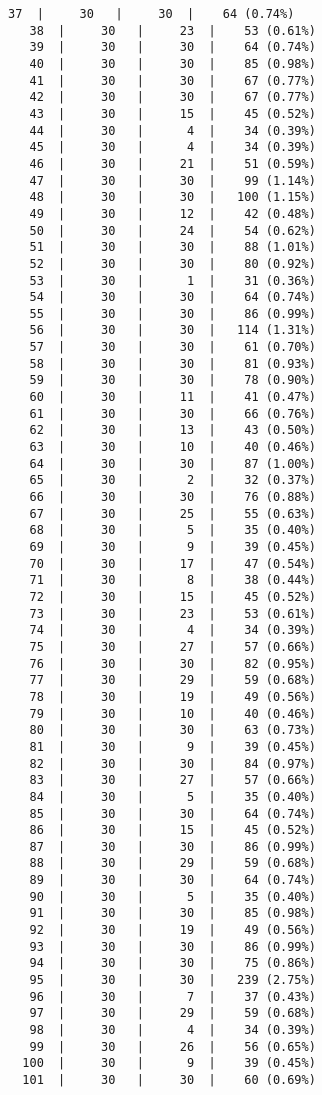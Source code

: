 \documentclass[10pt]{article}
\begin{document}
\begin{Verbatim}[fontsize=\small, commandchars=\\\{\}]
   37  |     30   |     30  |    64 (0.74%)
   38  |     30   |     23  |    53 (0.61%)
   39  |     30   |     30  |    64 (0.74%)
   40  |     30   |     30  |    85 (0.98%)
   41  |     30   |     30  |    67 (0.77%)
   42  |     30   |     30  |    67 (0.77%)
   43  |     30   |     15  |    45 (0.52%)
   44  |     30   |      4  |    34 (0.39%)
   45  |     30   |      4  |    34 (0.39%)
   46  |     30   |     21  |    51 (0.59%)
   47  |     30   |     30  |    99 (1.14%)
   48  |     30   |     30  |   100 (1.15%)
   49  |     30   |     12  |    42 (0.48%)
   50  |     30   |     24  |    54 (0.62%)
   51  |     30   |     30  |    88 (1.01%)
   52  |     30   |     30  |    80 (0.92%)
   53  |     30   |      1  |    31 (0.36%)
   54  |     30   |     30  |    64 (0.74%)
   55  |     30   |     30  |    86 (0.99%)
   56  |     30   |     30  |   114 (1.31%)
   57  |     30   |     30  |    61 (0.70%)
   58  |     30   |     30  |    81 (0.93%)
   59  |     30   |     30  |    78 (0.90%)
   60  |     30   |     11  |    41 (0.47%)
   61  |     30   |     30  |    66 (0.76%)
   62  |     30   |     13  |    43 (0.50%)
   63  |     30   |     10  |    40 (0.46%)
   64  |     30   |     30  |    87 (1.00%)
   65  |     30   |      2  |    32 (0.37%)
   66  |     30   |     30  |    76 (0.88%)
   67  |     30   |     25  |    55 (0.63%)
   68  |     30   |      5  |    35 (0.40%)
   69  |     30   |      9  |    39 (0.45%)
   70  |     30   |     17  |    47 (0.54%)
   71  |     30   |      8  |    38 (0.44%)
   72  |     30   |     15  |    45 (0.52%)
   73  |     30   |     23  |    53 (0.61%)
   74  |     30   |      4  |    34 (0.39%)
   75  |     30   |     27  |    57 (0.66%)
   76  |     30   |     30  |    82 (0.95%)
   77  |     30   |     29  |    59 (0.68%)
   78  |     30   |     19  |    49 (0.56%)
   79  |     30   |     10  |    40 (0.46%)
   80  |     30   |     30  |    63 (0.73%)
   81  |     30   |      9  |    39 (0.45%)
   82  |     30   |     30  |    84 (0.97%)
   83  |     30   |     27  |    57 (0.66%)
   84  |     30   |      5  |    35 (0.40%)
   85  |     30   |     30  |    64 (0.74%)
   86  |     30   |     15  |    45 (0.52%)
   87  |     30   |     30  |    86 (0.99%)
   88  |     30   |     29  |    59 (0.68%)
   89  |     30   |     30  |    64 (0.74%)
   90  |     30   |      5  |    35 (0.40%)
   91  |     30   |     30  |    85 (0.98%)
   92  |     30   |     19  |    49 (0.56%)
   93  |     30   |     30  |    86 (0.99%)
   94  |     30   |     30  |    75 (0.86%)
   95  |     30   |     30  |   239 (2.75%)
   96  |     30   |      7  |    37 (0.43%)
   97  |     30   |     29  |    59 (0.68%)
   98  |     30   |      4  |    34 (0.39%)
   99  |     30   |     26  |    56 (0.65%)
  100  |     30   |      9  |    39 (0.45%)
  101  |     30   |     30  |    60 (0.69%)
\end{Verbatim}
\end{document}
